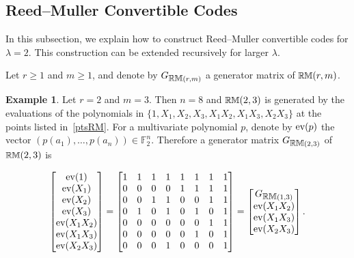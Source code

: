 \documentclass[conference, 10pt]{IEEEtran}
\theoremstyle{plain}
\theoremstyle{definition}
\newtheorem{example}[definition]{Example}
\newcommand{\RM}{{\text{\small $\mathbb{RM}$}}}
\newcommand{\numberset}{\mathbb}
\newcommand{\F}{\numberset{F}}
\begin{document}


\subsection{Reed--Muller Convertible Codes}

In this subsection, we explain how to construct Reed--Muller convertible codes for $\lambda=2$. This construction can be extended recursively for larger $\lambda$.

Let $r \ge 1$ and $m \ge 1$, and denote by $G_{\RM(r,m)}$ a generator matrix of $\RM(r,m)$.

\begin{example}
Let $r=2$ and $m=3$. Then $n=8$ and $\RM(2,3)$ is generated by the evaluations 
of the polynomials in $\{1,X_1, X_2, X_3,X_1X_2,X_1X_3,X_2X_3\}$ at the points listed in~\eqref{ptsRM}. For a multivariate polynomial $p$, denote by $\textup{ev}(p)$ the vector $(p(a_1),\dots,p(a_n)) \in \F_2^n$.
Therefore a generator matrix $G_{\RM(2,3)}$ of $\RM(2,3)$ is
\begin{small}
\begin{align} \label{eq:RMex}
\begin{bmatrix}
        \textup{ev}(1) \\
        \textup{ev}(X_1) \\
        \textup{ev}(X_2) \\
        \textup{ev}(X_3) \\
        \textup{ev}(X_1X_2) \\
        \textup{ev}(X_1X_3) \\
        \textup{ev}(X_2X_3) \\
    \end{bmatrix}
    = 
    \begin{bmatrix}
1  & 1 & 1 & 1 & 1 & 1 & 1 & 1 \\
0  & 0 & 0 & 0 & 1 & 1 & 1 & 1 \\
0  & 0 & 1 & 1 & 0 & 0 & 1 & 1 \\
0  & 1 & 0 & 1 & 0 & 1 & 0 & 1 \\
0  & 0 & 0 & 0 & 0 & 0 & 1 & 1 \\
0  & 0 & 0 & 0 & 0 & 1 & 0 & 1 \\
0  & 0 & 0 & 1 & 0 & 0 & 0 & 1
\end{bmatrix} 
= \begin{bmatrix}
        G_{\RM(1,3)} \\
        \textup{ev}(X_1X_2) \\
        \textup{ev}(X_1X_3) \\
        \textup{ev}(X_2X_3) \\
    \end{bmatrix}.
\end{align}
\end{small}
\end{example}
\end{document}
